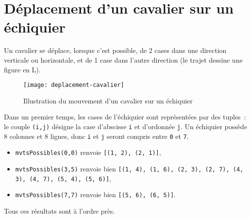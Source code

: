 \vspace{-0.5cm}
\section*{Déplacement d'un cavalier sur un échiquier}


Un cavalier se déplace, lorsque c'est possible, de 2 cases dans une direction verticale ou horizontale, et de 1 case dans l'autre direction (le trajet dessine une figure en L).

\begin{figure}[h]
	\begin{center}
		\texttt{[image: deplacement-cavalier]}
	\end{center}
	\caption{Illustration du mouvement d'un cavalier sur un échiquier}
\end{figure}

Dans un premier temps, les cases de l'échiquier sont représentées par des tuples~: le couple \texttt{(i,j)} désigne la case d'abscisse \texttt{i} et d'ordonnée \texttt{j}. Un échiquier possède 8 colonnes et 8 lignes, donc \texttt{i} et \texttt{j} seront compris entre \texttt{0} et \texttt{7}.



{}
\vspace{-.5cm}
\begin{itemize}
	\item \texttt{mvtsPossibles(0,0)} renvoie \texttt{[(1, 2), (2, 1)]},
	\item \texttt{mvtsPossibles(3,5)} renvoie bien \texttt{[(1, 4), (1, 6), (2, 3), (2, 7), (4, 3), (4, 7), (5, 4), (5, 6)]},
	\item \texttt{mvtsPossibles(7,7)} renvoie bien \texttt{[(5, 6), (6, 5)]}.
\end{itemize}

Tous ces résultats sont à l'ordre près. 


